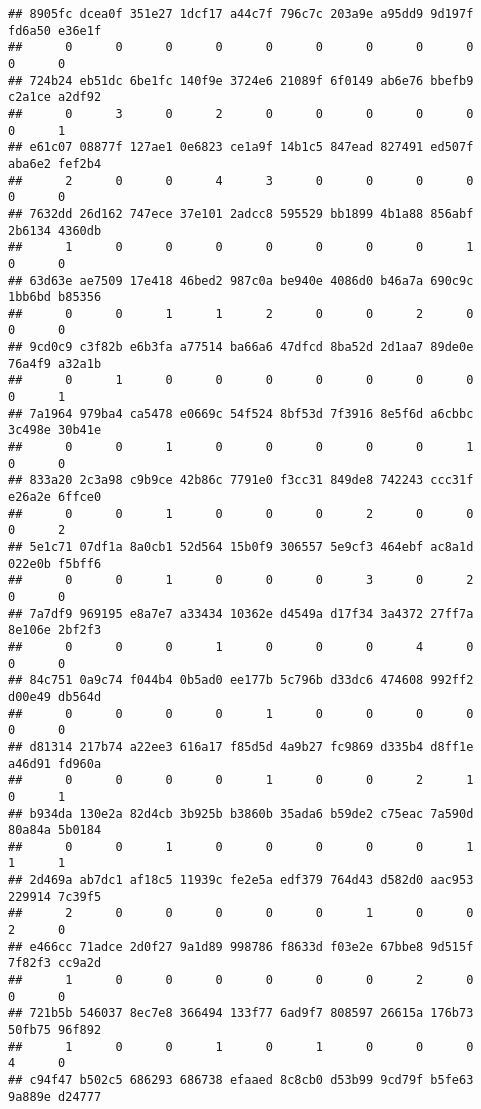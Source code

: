 \documentclass[
]{article}
\begin{document}
\begin{verbatim}
## 8905fc dcea0f 351e27 1dcf17 a44c7f 796c7c 203a9e a95dd9 9d197f fd6a50 e36e1f 
##      0      0      0      0      0      0      0      0      0      0      0 
## 724b24 eb51dc 6be1fc 140f9e 3724e6 21089f 6f0149 ab6e76 bbefb9 c2a1ce a2df92 
##      0      3      0      2      0      0      0      0      0      0      1 
## e61c07 08877f 127ae1 0e6823 ce1a9f 14b1c5 847ead 827491 ed507f aba6e2 fef2b4 
##      2      0      0      4      3      0      0      0      0      0      0 
## 7632dd 26d162 747ece 37e101 2adcc8 595529 bb1899 4b1a88 856abf 2b6134 4360db 
##      1      0      0      0      0      0      0      0      1      0      0 
## 63d63e ae7509 17e418 46bed2 987c0a be940e 4086d0 b46a7a 690c9c 1bb6bd b85356 
##      0      0      1      1      2      0      0      2      0      0      0 
## 9cd0c9 c3f82b e6b3fa a77514 ba66a6 47dfcd 8ba52d 2d1aa7 89de0e 76a4f9 a32a1b 
##      0      1      0      0      0      0      0      0      0      0      1 
## 7a1964 979ba4 ca5478 e0669c 54f524 8bf53d 7f3916 8e5f6d a6cbbc 3c498e 30b41e 
##      0      0      1      0      0      0      0      0      1      0      0 
## 833a20 2c3a98 c9b9ce 42b86c 7791e0 f3cc31 849de8 742243 ccc31f e26a2e 6ffce0 
##      0      0      1      0      0      0      2      0      0      0      2 
## 5e1c71 07df1a 8a0cb1 52d564 15b0f9 306557 5e9cf3 464ebf ac8a1d 022e0b f5bff6 
##      0      0      1      0      0      0      3      0      2      0      0 
## 7a7df9 969195 e8a7e7 a33434 10362e d4549a d17f34 3a4372 27ff7a 8e106e 2bf2f3 
##      0      0      0      1      0      0      0      4      0      0      0 
## 84c751 0a9c74 f044b4 0b5ad0 ee177b 5c796b d33dc6 474608 992ff2 d00e49 db564d 
##      0      0      0      0      1      0      0      0      0      0      0 
## d81314 217b74 a22ee3 616a17 f85d5d 4a9b27 fc9869 d335b4 d8ff1e a46d91 fd960a 
##      0      0      0      0      1      0      0      2      1      0      1 
## b934da 130e2a 82d4cb 3b925b b3860b 35ada6 b59de2 c75eac 7a590d 80a84a 5b0184 
##      0      0      1      0      0      0      0      0      1      1      1 
## 2d469a ab7dc1 af18c5 11939c fe2e5a edf379 764d43 d582d0 aac953 229914 7c39f5 
##      2      0      0      0      0      0      1      0      0      2      0 
## e466cc 71adce 2d0f27 9a1d89 998786 f8633d f03e2e 67bbe8 9d515f 7f82f3 cc9a2d 
##      1      0      0      0      0      0      0      2      0      0      0 
## 721b5b 546037 8ec7e8 366494 133f77 6ad9f7 808597 26615a 176b73 50fb75 96f892 
##      1      0      0      1      0      1      0      0      0      4      0 
## c94f47 b502c5 686293 686738 efaaed 8c8cb0 d53b99 9cd79f b5fe63 9a889e d24777 

\end{verbatim}
\end{document}
